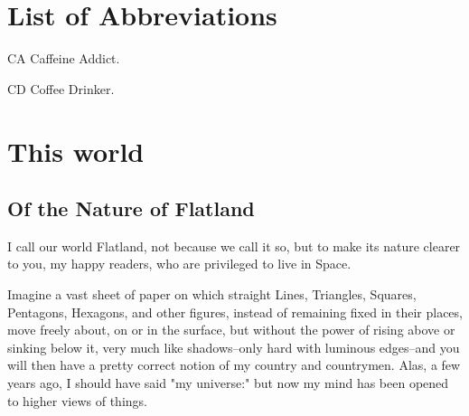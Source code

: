 \documentclass[edeposit,fullpage]{uiucthesis2014}
\begin{document}

\tableofcontents
\listoftables
\listoffigures

\chapter{List of Abbreviations}

\begin{symbollist*}
\item[CA] Caffeine Addict.
\item[CD] Coffee Drinker.
\end{symbollist*}

\mainmatter
\chapter{This world}
\section{Of the Nature of Flatland}

I call our world Flatland, not because we call it so, but to make its
nature clearer to you, my happy readers, who are privileged to live in
Space.

Imagine a vast sheet of paper on which straight Lines, Triangles,
Squares, Pentagons, Hexagons, and other figures, instead of remaining
fixed in their places, move freely about, on or in the surface, but
without the power of rising above or sinking below it, very much like
shadows--only hard with luminous edges--and you will then have a pretty
correct notion of my country and countrymen.  Alas, a few years ago, I
should have said "my universe:"  but now my mind has been opened to
higher views of things.
\end{document}
